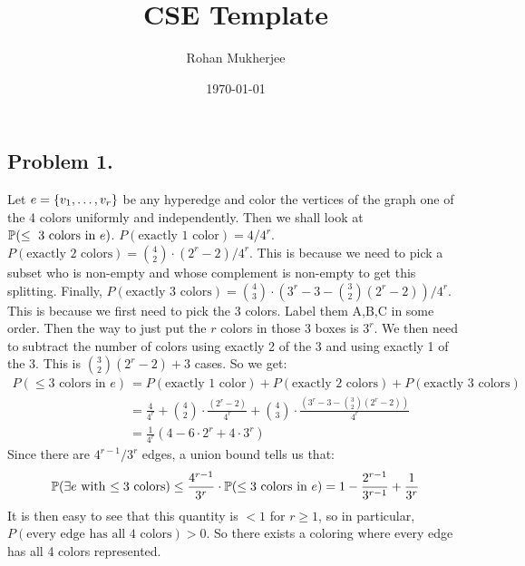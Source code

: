 \documentclass[12pt]{article}
\title{CSE Template}
\date{\today}
\author{Rohan Mukherjee}
\renewcommand{\P}{\mathbb P\qty}
\newcommand{\SET}[1]{\Set{\mskip-\medmuskip #1 \mskip-\medmuskip}}
\begin{document}
    \maketitle
    \subsection*{Problem 1.}
    Let $e = \SET{v_1, \ldots, v_r}$ be any hyperedge and color the vertices of the graph one of the 4 colors uniformly and independently. Then we shall look at $\P(\leq\text{ 3 colors in } e)$. $P(\text{exactly 1 color}) = 4/4^r$. $P(\text{exactly 2 colors}) = {4 \choose 2} \cdot (2^r - 2)/4^r$. This is because we need to pick a subset who is non-empty and whose complement is non-empty to get this splitting. Finally, $P(\text{exactly 3 colors}) = {4 \choose 3} \cdot (3^r - 3 - {3 \choose 2}(2^r-2))/4^r$. This is because we first need to pick the 3 colors. Label them A,B,C in some order. Then the way to just put the $r$ colors in those 3 boxes is $3^r$. We then need to subtract the number of colors using exactly 2 of the 3 and using exactly 1 of the 3. This is ${3 \choose 2} (2^r-2) + 3$ cases. So we get:
    \begin{align*}
        P(\leq 3 \text{ colors in $e$}) &= P(\text{exactly 1 color}) + P(\text{exactly 2 colors}) + P(\text{exactly 3 colors}) \\
        &= \frac{4}{4^r} + {4 \choose 2} \cdot \frac{(2^r - 2)}{4^r} + {4 \choose 3} \cdot \frac{(3^r - 3 - {3 \choose 2}(2^r-2))}{4^r} \\
        &= \frac{1}{4^r} \left(4 - 6 \cdot 2^r + 4 \cdot 3^r \right)
    \end{align*}
    Since there are $4^{r-1}/3^r$ edges, a union bound tells us that:
    \begin{align*}
        \P(\exists e \text{ with $\leq 3$ colors} ) &\leq \frac{4^{r-1}}{3^r} \cdot \P(\leq 3 \text{ colors in $e$}) = 1 - \frac{2^{r-1}}{3^{r-1}} + \frac{1}{3^r} \\
    \end{align*}
    It is then easy to see that this quantity is $< 1$ for $r \geq 1$, so in particular, $P(\text{every edge has all 4 colors}) > 0$. So there exists a coloring where every edge has all 4 colors represented.
\end{document}
